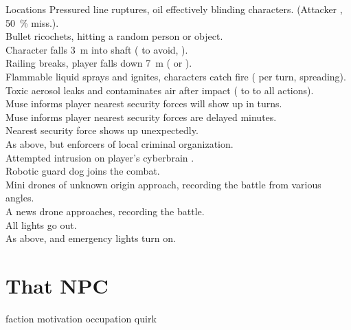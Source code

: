 \documentclass[a4]{book}
\begin{document}
\begin{tableone}{Locations}
Pressured line ruptures, oil effectively blinding characters. (Attacker , \SI{50}{\percent} miss.).\\
Bullet ricochets, hitting a random person or object.\\
Character falls \SI{3}{\m} into shaft ( to avoid,  ). \\
Railing breaks, player falls down \SI{7}{\m} ( or  ). \\
Flammable liquid sprays and ignites, characters catch fire ( per turn, spreading). \\
Toxic aerosol leaks and contaminates air after impact ( to  to all actions). \\
Muse informs player nearest security forces will show up in  turns.\\
Muse informs player nearest security forces are delayed  minutes.\\
Nearest security force shows up unexpectedly.\\
As above, but enforcers of local criminal organization.\\
Attempted intrusion on player's cyberbrain .\\
Robotic guard dog joins the combat.\\
Mini drones of unknown origin approach, recording the battle from various angles.\\
A news drone approaches, recording the battle.\\
All lights go out.\\
As above, and emergency lights turn on.\\
\end{tableone}

\section*{That NPC}

faction
motivation
occupation
quirk
\end{document}
